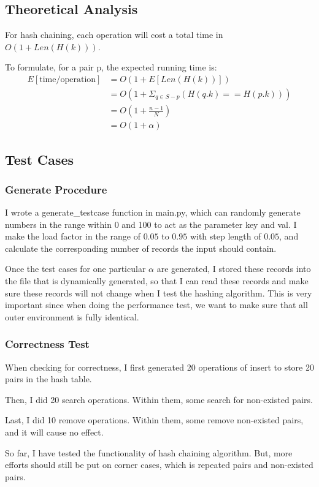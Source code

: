 \documentclass{article}
\begin{document}
\begin{spacing}{1.2}
\subsection{Theoretical Analysis}
For hash chaining, each operation will cost a total time in $O(1 + Len(H(k)))$.

To formulate, for a pair p, the expected running time is:
\begin{align*}
    E[\text{time/operation}] &= O(1 + E[Len(H(k))])\\
    &= O(1 + \Sigma_{q \in S - p}(H(q.k) == H(p.k)))\\
    &= O(1 + \frac{n-1}{N})\\
    &= O(1 + \alpha)
\end{align*}

\subsection{Test Cases}
\subsubsection{Generate Procedure}
I wrote a generate\_testcase function in main.py, which can randomly generate numbers in the range within 0 and 100 to act as the parameter key and val. I make the load factor in the range of $0.05$ to $0.95$ with step length of $0.05$, and calculate the corresponding number of records the input should contain.

Once the test cases for one particular $\alpha$ are generated, I stored these records into the file that is dynamically generated, so that I can read these records and make sure these records will not change when I test the hashing algorithm. This is very important since when doing the performance test, we want to make sure that all outer environment is fully identical.

\subsubsection{Correctness Test}
When checking for correctness, I first generated 20 operations of insert to store 20 pairs in the hash table.

Then, I did 20 search operations. Within them, some search for non-existed pairs.

Last, I did 10 remove operations. Within them, some remove non-existed pairs, and it will cause no effect.

So far, I have tested the functionality of hash chaining algorithm. But, more efforts should still be put on corner cases, which is repeated pairs and non-existed pairs.


\end{spacing}
\end{document}

